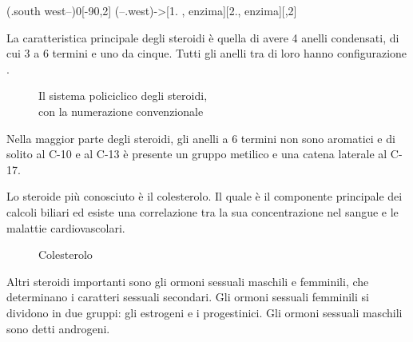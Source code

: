 \begin{reaction}
	\arrow(.south west--){0}[-90,2]
	\phantom{O}
	\arrow(--.west){->[1. , enzima][2.\!\!\!\!\!\!, enzima]}[,2]
\end{reaction}

La caratteristica principale degli steroidi è quella di avere 4 anelli condensati, di cui 3 a 6 termini e uno da cinque. Tutti gli anelli tra di loro hanno configurazione \trans.

\begin{figure}[H]
	\centering

	\caption*{\color{blue}Il sistema policiclico degli steroidi,\\con la numerazione convenzionale}
\end{figure}
Nella maggior parte degli steroidi, gli anelli a 6 termini non sono aromatici e di solito al C-10 e al C-13 è presente un gruppo metilico e una catena laterale al C-17.

Lo steroide più conosciuto è il colesterolo. Il quale è il componente principale dei calcoli biliari ed esiste una correlazione tra la sua concentrazione nel sangue e le malattie cardiovascolari.

\begin{figure}[H]
	\centering
\caption*{Colesterolo}
\end{figure}

Altri steroidi importanti sono gli ormoni sessuali maschili e femminili, che determinano i caratteri sessuali secondari. Gli ormoni sessuali femminili si dividono in due gruppi: gli estrogeni e i progestinici. Gli ormoni sessuali maschili sono detti androgeni.